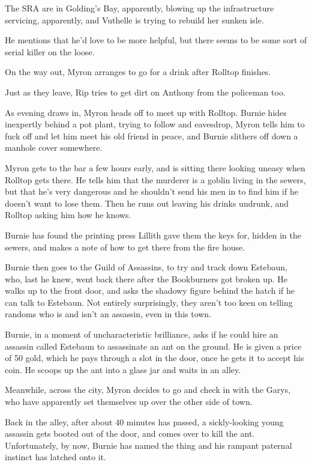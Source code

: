 The SRA are in Golding’s Bay, apparently, blowing up the infrastructure servicing, apparently, and Vuthelle is trying to rebuild her sunken isle.\medskip

He mentions that he’d love to be more helpful, but there seems to be some sort of serial killer on the loose.\medskip

On the way out, Myron arranges to go for a drink after Rolltop finishes.\medskip

Just as they leave, Rip tries to get dirt on Anthony from the policeman too.\medskip

As evening draws in, Myron heads off to meet up with Rolltop. Burnie hides inexpertly behind a pot plant, trying to follow and eavesdrop, Myron tells him to fuck off and let him meet his old friend in peace, and Burnie slithers off down a manhole cover somewhere.\medskip

Myron gets to the bar a few hours early, and is sitting there looking uneasy when Rolltop gets there. He tells him that the murderer is a goblin living in the sewers, but that he’s very dangerous and he shouldn’t send his men in to find him if he doesn’t want to lose them. Then he runs out leaving his drinks undrunk, and Rolltop asking him how he knows.\medskip

Burnie has found the printing press Lillith gave them the keys for, hidden in the sewers, and makes a note of how to get there from the fire house.\medskip

Burnie then goes to the Guild of Assassins, to try and track down Estebaun, who, last he knew, went back there after the Bookburners got broken up. He walks up to the front door, and asks the shadowy figure behind the hatch if he can talk to Estebaun. Not entirely surprisingly, they aren’t too keen on telling randoms who is and isn’t an assassin, even in this town.\medskip

Burnie, in a moment of uncharacteristic brilliance, asks if he could hire an assassin called Estebaun to assassinate an ant on the ground. He is given a price of 50 gold, which he pays through a slot in the door, once he gets it to accept his coin. He scoops up the ant into a glass jar and waits in an alley.\medskip

Meanwhile, across the city, Myron decides to go and check in with the Garys, who have apparently set themselves up over the other side of town.\medskip

Back in the alley, after about 40 minutes has passed, a sickly-looking young assassin gets booted out of the door, and comes over to kill the ant. Unfortunately, by now, Burnie has named the thing and his rampant paternal instinct has latched onto it.\medskip

